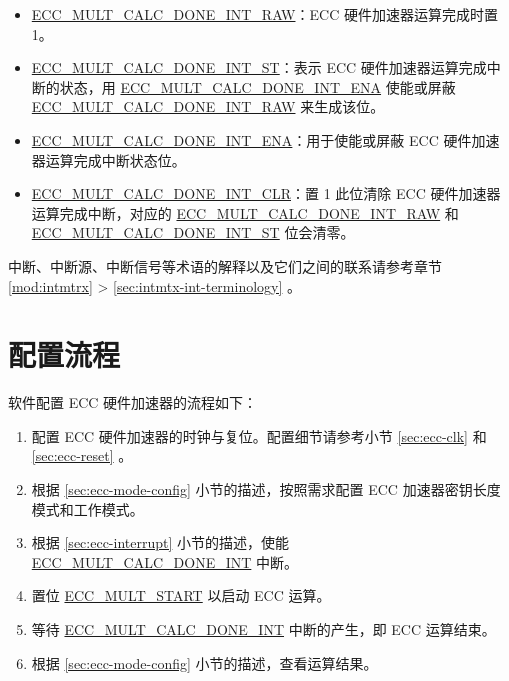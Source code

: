 \documentclass[main\_\_CN.tex]{subfiles}
\begin{document}
\begin{itemize}
    \item \hyperref[fielddesc:ECCMULTCALCDONEINTRAW]{ECC\_MULT\_CALC\_DONE\_INT\_RAW}：ECC 硬件加速器运算完成时置 1。
    \item \hyperref[fielddesc:ECCMULTCALCDONEINTST]{ECC\_MULT\_CALC\_DONE\_INT\_ST}：表示 ECC 硬件加速器运算完成中断的状态，用 \hyperref[fielddesc:ECCMULTCALCDONEINTENA]{ECC\_MULT\_CALC\_DONE\_INT\_ENA} 使能或屏蔽 \hyperref[fielddesc:ECCMULTCALCDONEINTRAW]{ECC\_MULT\_CALC\_DONE\_INT\_RAW} 来生成该位。
    \item \hyperref[fielddesc:ECCMULTCALCDONEINTENA]{ECC\_MULT\_CALC\_DONE\_INT\_ENA}：用于使能或屏蔽 ECC 硬件加速器运算完成中断状态位。
    \item \hyperref[fielddesc:ECCMULTCALCDONEINTCLR]{ECC\_MULT\_CALC\_DONE\_INT\_CLR}：置 1 此位清除 ECC 硬件加速器运算完成中断，对应的 \hyperref[fielddesc:ECCMULTCALCDONEINTRAW]{ECC\_MULT\_CALC\_DONE\_INT\_RAW} 和 \hyperref[fielddesc:ECCMULTCALCDONEINTST]{ECC\_MULT\_CALC\_DONE\_INT\_ST} 位会清零。
\end{itemize}

\begin{tiplisting}
中断、中断源、中断信号等术语的解释以及它们之间的联系请参考章节 \ref{mod:intmtrx} \textit{} > \ref{sec:intmtx-int-terminology} \textit{}。
\end{tiplisting}



\section{配置流程}

软件配置 ECC 硬件加速器的流程如下：

\begin{enumerate}
    \item 配置 ECC 硬件加速器的时钟与复位。配置细节请参考小节 \ref{sec:ecc-clk} 和 \ref{sec:ecc-reset} 。
    \item 根据 \ref{sec:ecc-mode-config} 小节的描述，按照需求配置 ECC 加速器密钥长度模式和工作模式。
    \item 根据 \ref{sec:ecc-interrupt} 小节的描述，使能 \hyperref[int:ECCMULTCALCDONEINT]{ECC\_MULT\_CALC\_DONE\_INT} 中断。
    \item 置位 \hyperref[fielddesc:ECCMULTSTART]{ECC\_MULT\_START} 以启动 ECC 运算。
    \item 等待 \hyperref[int:ECCMULTCALCDONEINT]{ECC\_MULT\_CALC\_DONE\_INT} 中断的产生，即 ECC 运算结束。
    \item 根据 \ref{sec:ecc-mode-config} 小节的描述，查看运算结果。
\end{enumerate}
\end{document}
